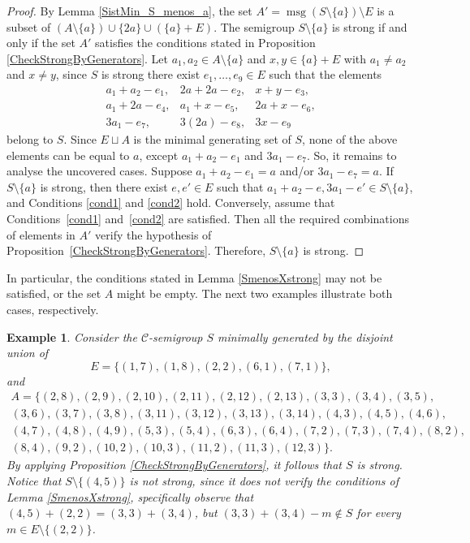 \documentclass[a4paper,11pt]{article}
\newtheorem{example}[theorem]{Example}
\def\CaC{\mathcal{C}}
\def\msg{\operatorname{msg}}
\begin{document}
{\begin{proof}
By Lemma \ref{SistMin_S_menos_a}, the set $A'=\msg (S\setminus\{a\})\setminus E$ is a subset of $(A\setminus\{a\})\cup \{2a\} \cup (\{a\}+E)$.
The semigroup $S\setminus\{a\}$ is strong if and only if the set $A'$ satisfies the conditions stated in Proposition \ref{CheckStrongByGenerators}. Let $a_1,a_2\in A\setminus\{a\}$ and $x,y\in \{a\}+ E$ with $a_1\neq a_2$ and $x\neq y$, since $S$ is strong there exist $e_1,\ldots, e_9 \in E$ such that the elements
\[
\begin{array}{rrr}
a_1+a_2-e_1, & 2a+2a-e_2, & x+y-e_3, \\
a_1+2a-e_4, & a_1+x-e_5, & 2a+x-e_6, \\
3a_1-e_7, & 3(2a)-e_8, & 3x-e_9
\end{array}
\]
belong to $S$.
Since $E \sqcup A$ is the minimal generating set of $S$, none of the above elements can be equal to $a$, except $a_1+a_2-e_1$ and $3a_1-e_7$.
So, it remains to analyse the uncovered cases.
Suppose $a_1 + a_2 - e_1 = a$ and/or $3a_1-e_7=a$. If $S \setminus \{a\}$ is strong, then there exist $e,e'\in E$ such that $a_1 + a_2 - e,3a_1-e'\in S\setminus\{a\}$, and Conditions \ref{cond1} and \ref{cond2} hold.
Conversely, assume that Conditions~\ref{cond1} and~\ref{cond2} are satisfied. Then all the required combinations of elements in $A'$ verify the hypothesis of Proposition~\ref{CheckStrongByGenerators}. Therefore, $S\setminus\{a\}$ is strong.
\end{proof}

In particular, the conditions stated in Lemma \ref{SmenosXstrong} may not be satisfied, or the set $A$ might be empty. The next two examples illustrate both cases, respectively.

\begin{example}\label{EjemploArbolNoInfinito}
Consider the $\CaC$-semigroup $S$ minimally generated by the disjoint union of
\[
E=\{(1,7), (1,8), (2,2), (6,1), (7,1)\},
\]
and
\begin{multline*}
A=\{
(2,8), (2,9), (2,10), (2,11), (2,12), (2,13), (3,3), (3,4), (3,5), \\ (3,6), (3,7), (3,8), (3,11), (3,12), (3,13), (3,14), (4,3), (4,5), (4,6),\\ (4,7), (4,8), (4,9), (5,3), (5,4), (6,3), (6,4), (7,2), (7,3), (7,4), (8,2),\\ (8,4), (9,2), (10,2), (10,3), (11,2), (11,3), (12,3) \}.
\end{multline*}
By applying Proposition \ref{CheckStrongByGenerators}, it follows that $S$ is strong.
Notice that $S\setminus \{ (4,5)\}$ is not strong, since it does not verify the conditions of Lemma \ref{SmenosXstrong}, specifically observe that $(4,5)+ (2,2)=(3,3)+(3,4)$, but $(3,3)+(3,4)-m\notin S$ for every $m\in E \setminus \{ (2,2)\}$.
\end{example}

}
\end{document}
